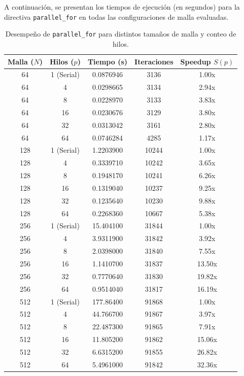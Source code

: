 \documentclass[11pt,a4paper]{article}
\begin{document}
A continuación, se presentan los tiempos de ejecución (en segundos) para la directiva \texttt{parallel\_for} en todas las configuraciones de malla evaluadas.

\begin{table}[H]
\centering
\renewcommand{\arraystretch}{1.2}
\small
\begin{tabular}{|c|c|c|c|c|}
\hline
\textbf{Malla ($N$)} & \textbf{Hilos ($p$)} & \textbf{Tiempo (s)} & \textbf{Iteraciones} & \textbf{Speedup $S(p)$} \\ \hline
64 & 1 (Serial) & 0.0876946 & 3136 & 1.00x \\ 
64 & 4 & 0.0298665 & 3134 & 2.94x \\ 
64 & 8 & 0.0228970 & 3133 & 3.83x \\ 
64 & 16 & 0.0230676 & 3129 & 3.80x \\ 
64 & 32 & 0.0313042 & 3161 & 2.80x \\ 
64 & 64 & 0.0746284 & 4285 & 1.17x \\ \hline
128 & 1 (Serial) & 1.2203900 & 10244 & 1.00x \\ 
128 & 4 & 0.3339710 & 10242 & 3.65x \\ 
128 & 8 & 0.1948170 & 10241 & 6.26x \\ 
128 & 16 & 0.1319040 & 10237 & 9.25x \\ 
128 & 32 & 0.1235640 & 10230 & 9.88x \\ 
128 & 64 & 0.2268360 & 10667 & 5.38x \\ \hline
256 & 1 (Serial) & 15.404100 & 31844 & 1.00x \\ 
256 & 4 & 3.9311900 & 31842 & 3.92x \\ 
256 & 8 & 2.0398000 & 31840 & 7.55x \\ 
256 & 16 & 1.1410700 & 31837 & 13.50x \\ 
256 & 32 & 0.7770640 & 31830 & 19.82x \\ 
256 & 64 & 0.9514040 & 31817 & 16.19x \\ \hline
512 & 1 (Serial) & 177.86400 & 91868 & 1.00x \\ 
512 & 4 & 44.766700 & 91867 & 3.97x \\ 
512 & 8 & 22.487300 & 91865 & 7.91x \\ 
512 & 16 & 11.805200 & 91862 & 15.06x \\ 
512 & 32 & 6.6315200 & 91855 & 26.82x \\ 
512 & 64 & 5.4961000 & 91842 & 32.36x \\ \hline
\end{tabular}
\caption{Desempeño de \texttt{parallel\_for} para distintos tamaños de malla y conteo de hilos.}
\label{tab:resultados_parallel_for}
\end{table}
\end{document}
